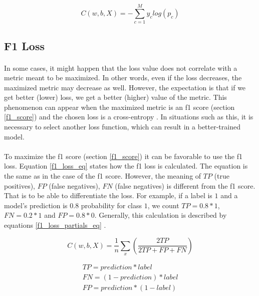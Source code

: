 \begin{equation}
C(w, b, X) = -\sum_{c=1}^{M} y_{c}log(p_{c})
\label{cross_entropy_eq}
\end{equation} 

\subsection{F1 Loss}\label{f1_loss}
\paragraph{}
In some cases, it might happen that the loss value does not correlate with a metric meant to be maximized. In other words, even if the loss decreases, the maximized metric may decrease as well. However, the expectation is that if we get better (lower) loss, we get a better (higher) value of the metric. This phenomenon can appear when the maximized metric is an f1 score (section \ref{f1_score}) and the chosen loss is a cross-entropy \cite{f1_loss}. In situations such as this, it is necessary to select another loss function, which can result in a better-trained model.

\paragraph{}
To maximize the f1 score (section \ref{f1_score}) it can be favorable to use the f1 loss. Equation \ref{f1_loss_eq} states how the f1 loss is calculated. The equation is the same as in the case of the f1 score. However, the meaning of $TP$ (true positives), $FP$ (false negatives), $FN$ (false negatives) is different from the f1 score. That is to be able to differentiate the loss. For example, if a label is $1$ and a model's prediction is $0.8$ probability for class $1$, we count $TP=0.8*1$, $FN=0.2*1$ and $FP=0.8*0$. Generally, this calculation is described by equations \ref{f1_loss_partials_eq} \cite{f1_loss_towards}.

\begin{equation}
C(w, b, X) = \frac{1}{n}\sum_{x}^{}(\frac{2TP}{2TP+FP+FN})
\label{f1_loss_eq}
\end{equation} 

\begin{equation}
\begin{gathered}
TP = prediction * label \\
FN = (1 - prediction)*label \\
FP = prediction * (1-label)
\label{f1_loss_partials_eq}
\end{gathered}
\end{equation} 

